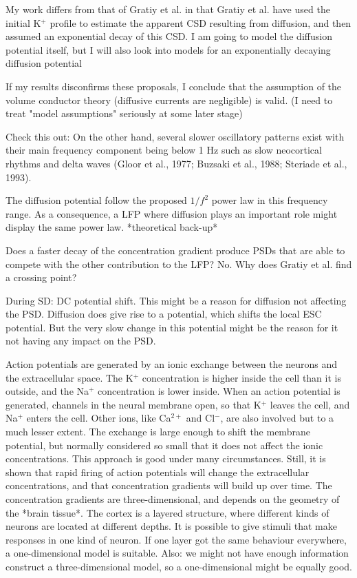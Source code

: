 \documentclass{article}
\begin{document}
 My work differs from that of Gratiy et al. in that Gratiy et al. have used the initial K$^+$ profile to estimate the apparent CSD resulting from diffusion, and then assumed an exponential decay of this CSD. I am going to model the diffusion potential itself, but I will also look into models for an exponentially decaying diffusion potential

If my results disconfirms these proposals, I conclude that the assumption of the volume conductor theory (diffusive currents are negligible) is valid. 
(I need to treat "model assumptions" seriously at some later stage)

Check this out: On the
other hand, several slower oscillatory patterns exist with their main
frequency component being below 1 Hz such as slow neocortical
rhythms and delta waves (Gloor et al., 1977; Buzsaki et al., 1988;
Steriade et al., 1993).

The diffusion potential follow the proposed  $1/f^2$ power law in this frequency range. As a consequence, a LFP where diffusion plays an important role might display the same power law.  *theoretical back-up*

Does a faster decay of the concentration gradient produce PSDs that are able to compete with the other contribution to the LFP? No. Why does Gratiy et al. find a crossing point? 


During SD: DC potential shift. This might be a reason for diffusion not affecting the PSD. Diffusion does give rise to a potential, which shifts the local ESC potential. But the very slow change in this potential might be the reason for it not having any impact on the PSD.


Action potentials are generated by an ionic exchange between the neurons and the extracellular space. The K$^+$ concentration is higher inside the cell than it is outside, and the Na$^+$ concentration is lower inside. When an action potential is generated,  channels in the neural membrane open, so that K$^+$ leaves the cell, and Na$^+$ enters the cell. Other ions, like Ca$^{2+}$ and Cl$^-$, are also involved but to a much lesser extent. The exchange is large enough to shift the membrane potential, but normally considered so small that it does not affect the ionic concentrations. This approach is good under many circumstances. Still, it is shown that rapid firing of action potentials will change the extracellular concentrations, and that concentration gradients will build up over time. The concentration gradients are three-dimensional, and depends on the geometry of the *brain tissue*.  The cortex is a layered structure, where different kinds of neurons are located at different depths. It is possible to give stimuli that make responses in one kind of neuron. If one layer got the same behaviour everywhere, a one-dimensional model is suitable. Also: we might not have enough information construct a three-dimensional model, so a one-dimensional might be equally good. 
\end{document}
